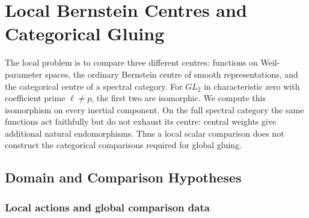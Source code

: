 \chapter{Local Bernstein Centres and Categorical Gluing}
\label{v4-arith:w10-e:chapter}

The local problem is to compare three different centres: functions on
Weil-parameter spaces, the ordinary Bernstein centre of smooth
representations, and the categorical centre of a spectral category.
For $GL_2$ in characteristic zero with coefficient prime $\ell\neq p$,
the first two are isomorphic. We compute this isomorphism on every
inertial component. On the full spectral category the same functions
act faithfully but do not exhaust its centre: central weights give
additional natural endomorphisms. Thus a local scalar comparison
does not construct the categorical comparisons required for global
gluing.

\section{Domain and Comparison Hypotheses}
\label{v4-arith:w10-e:domain}

\subsection{Local actions and global comparison data}

